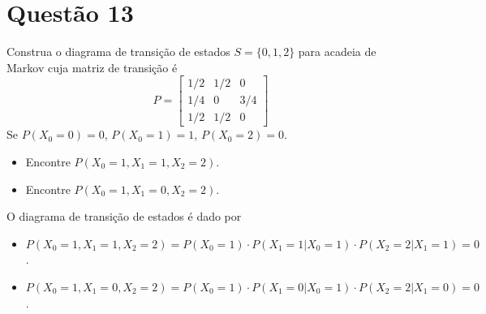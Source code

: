 \section{Questão 13}

Construa o diagrama de transição de estados $S = \{0, 1, 2\}$ para acadeia de Markov cuja matriz de transição é
%
$$
P =
\begin{bmatrix}
    1/2 & 1/2 & 0 \\
    1/4 & 0 & 3/4 \\
    1/2 & 1/2 & 0
\end{bmatrix}
$$
%
Se $P(X_0=0)=0$, $P(X_0=1)=1$, $P(X_0=2)=0$. 
%
\begin{itemize}
    \item [a)] Encontre $P(X_0=1, X_1=1, X_2=2)$.
    \item [b)] Encontre $P(X_0=1, X_1=0, X_2=2)$.
\end{itemize}

\begin{respostas}
    O diagrama de transição de estados é dado por
    \begin{figure}[H]
        \centering
    \end{figure}
    \begin{itemize}
        \item [a)] $P(X_0=1, X_1=1, X_2=2) = P(X_0=1) \cdot P(X_1=1 | X_0=1) \cdot P(X_2=2 | X_1=1) = 0$.
        \item [b)] $P(X_0=1, X_1=0, X_2=2) = P(X_0=1) \cdot P(X_1=0 | X_0=1) \cdot P(X_2=2 | X_1=0) = 0$.
    \end{itemize}
\end{respostas}